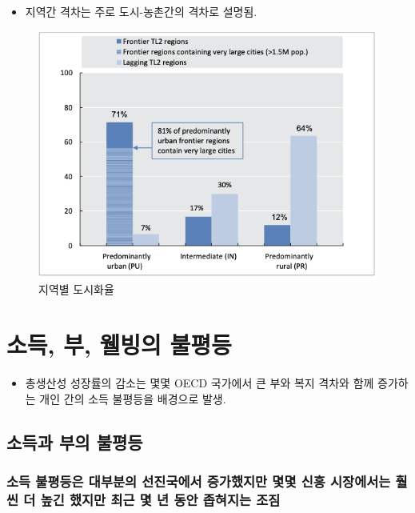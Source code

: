 \documentclass[aspectratio=169,xcolor=dvipsnames,handout]{beamer}
\begin{document}
\begin{frame}{}
    \begin{itemize}
        \item 지역간 격차는 주로 도시-농촌간의 격차로 설명됨.
    \end{itemize}
    \begin{figure}
        \centering
        \includegraphics[scale=.3]{pic/tpin1.12.png}
        \caption{지역별 도시화율}
    \end{figure}
\end{frame}


\section{소득, 부, 웰빙의 불평등}

\begin{frame}{}
    \begin{itemize}
        \item 총생산성 성장률의 감소는 몇몇 OECD 국가에서 큰 부와 복지 격차와 함께 증가하는 개인 간의 소득 불평등을 배경으로 발생.
    \end{itemize}
\end{frame}

\subsection{소득과 부의 불평등}

\subsubsection{ 소득 불평등은 대부분의 선진국에서 증가했지만 몇몇 신흥 시장에서는 훨씬 더 높긴 했지만 최근 몇 년 동안 좁혀지는 조짐}
\end{document}
